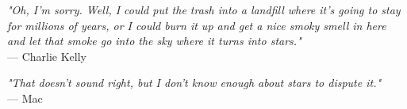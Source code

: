 \begin{flushright}
\emph{"Oh, I'm sorry. Well, I could put the trash into a landfill where it's going to stay for millions of years, or I could burn it up and get a nice smoky smell in here and let that smoke go into the sky where it turns into stars."}\\
--- Charlie Kelly
\end{flushright}

\begin{flushright}
\emph{"That doesn't sound right, but I don't know enough about stars to dispute it."}\\
--- Mac
\end{flushright}
